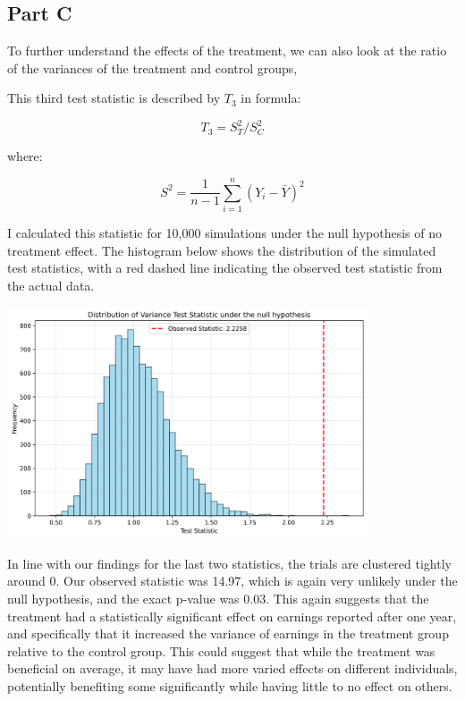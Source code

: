 \documentclass[12pt]{article}
\begin{document}
\subsection{Part C}

To further understand the effects of the treatment, we can also look at the ratio of the variances of the treatment and control groups, 
\newline

This third test statistic is described by $T_3$ in formula:

\[T_3 = S^2_T / S^2_C\]

where:

\[S^2 = \frac{1}{n-1} \sum_{i=1}^{n} (Y_i - \bar{Y})^2\]

I calculated this statistic for 10,000 simulations under the null hypothesis of no treatment effect. The histogram below shows the distribution of the simulated test statistics, with a red dashed line indicating the observed test statistic from the actual data.

\vspace*{2em}
\includegraphics[width=0.8\textwidth]{stat3_graph.png}
\vspace*{2em}

In line with our findings for the last two statistics, the trials are clustered tightly around 0. Our observed statistic was 14.97, which is again very unlikely under the null hypothesis, and the exact p-value was 0.03. This again suggests that the treatment had a statistically significant effect on earnings reported after one year, and specifically that it increased the variance of earnings in the treatment group relative to the control group. This could suggest that while the treatment was beneficial on average, it may have had more varied effects on different individuals, potentially benefiting some significantly while having little to no effect on others.
\end{document}
